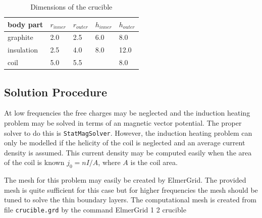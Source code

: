 \begin{table}
\caption{Dimensions of the crucible}
\label{tab:ind_heat2}
\begin{center}
\begin{tabular}{lllll} \hline
body part &  $r_{inner}$ & $r_{outer}$ & $h_{inner}$ & $h_{outer}$ \\ \hline
graphite  &  2.0   &  2.5 & 6.0 & 8.0 \\
insulation &  2.5   &  4.0 & 8.0 & 12.0 \\
coil      &  5.0   & 5.5  &     & 8.0  \\ \hline
\end{tabular}
\end{center}
\end{table}


\subsection*{Solution Procedure}

At low frequencies the free charges may be neglected and the 
induction heating problem may be solved in terms 
of an magnetic vector potential. The proper solver to do
this is \texttt{StatMagSolver}.
However, the induction heating problem can only be modelled if the helicity 
of the coil is neglected and an average current density is assumed.
This current density may be computed easily when the 
area of the coil is known $j_0=n I / A$, where $A$ is the 
coil area.

The mesh for this problem may easily be created by ElmerGrid.
The provided mesh is quite sufficient for this case
but for higher frequencies the mesh should be tuned 
to solve the thin boundary layers.
The computational mesh is created from file \texttt{crucible.grd} by the 
command 
\ttbegin
ElmerGrid 1 2 crucible
\ttend

